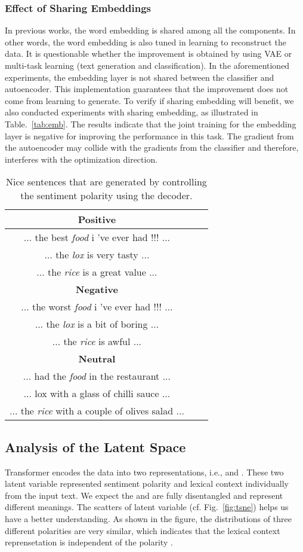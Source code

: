 \documentclass[11pt,a4paper]{article}
\begin{document}
\subsubsection{Effect of Sharing Embeddings}
In previous works, the word embedding is shared among
all the components. In other words, the word embedding is also tuned in learning to reconstruct the data. It is questionable whether the improvement is obtained by using VAE or multi-task learning (text generation and classification). In the aforementioned experiments, the embedding layer is not shared between the classifier and autoencoder. This implementation guarantees that the improvement does not come from learning to generate.
To verify if sharing embedding will benefit, we also conducted experiments with sharing embedding, as illustrated in Table.~\ref{tab:emb}.
The results indicate that the joint training for the embedding layer is negative for improving the performance in this task. The gradient from the autoencoder may collide with the gradients from the classifier and therefore,
interferes with the optimization direction.


\begin{table}
	\centering
	\begin{tabular}{ccc}
		\toprule
		\textbf{Positive}\\
		\hline
... the best \emph{food} i 've ever had !!! ...  \\
		... the \emph{lox} is very tasty ... \\
		... the \emph{rice} is a great value ... \\
		\toprule
		\textbf{Negative}\\
		\hline
... the worst \emph{food} i 've ever had !!! ... \\
		... the \emph{lox} is a bit of boring ... \\
		... the \emph{rice} is awful ... \\
		\toprule
		\textbf{Neutral}\\
		\hline
... had the \emph{food} in the restaurant ... \\
		... lox with a glass of chilli sauce ... \\
		... the \emph{rice} with a couple of olives salad ... \\
		\hline
	\end{tabular}
	\caption{Nice sentences that are generated by controlling the sentiment polarity  using the decoder. }\label{tab:gen}
\end{table}

\subsection{Analysis of the Latent Space}
Transformer encodes the data into two representations, i.e.,  and . These two latent variable represented sentiment polarity and lexical context individually from the input text.
We expect the  and  are fully disentangled and represent different meanings. The scatters of latent variable  (cf. Fig.~\ref{fig:tsne}) helps us have a better understanding.
As shown in the figure, the distributions of three different polarities are very similar, which indicates that the lexical context reprensetation  is independent of the polarity .
\end{document}
